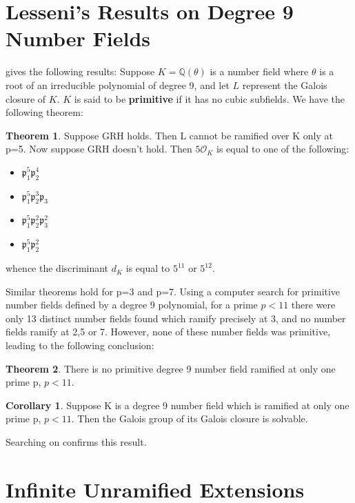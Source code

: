 \documentclass[12pt]{extarticle}
\newcommand{\<}{\langle}
\renewcommand{\>}{\rangle}
\theoremstyle{definition}
\newtheorem{theorem}{Theorem}
\newtheorem{corollary}{Corollary}
\begin{document}
\section{Lesseni's Results on Degree 9 Number Fields}
\cite{LESSENI} gives the following results:
Suppose $K=\mathbb{Q}(\theta)$ is a number field where $\theta$ is a root of an irreducible polynomial of degree 9, and let $L$ represent the Galois closure of $K$. $K$ is said to be \textbf{primitive} if it has no cubic subfields. We have the following theorem: \begin{theorem}
    Suppose GRH holds. Then L cannot be ramified over K only at p=5. Now suppose GRH doe{}sn't hold. Then $5\mathcal{O}_K$ is equal to one of the following: \begin{itemize}
        \item $\mathfrak{p}_1^5\mathfrak{p}_2^4$
        \item $\mathfrak{p}_1^5\mathfrak{p}_2^3\mathfrak{p}_3$
        \item $\mathfrak{p}_1^5\mathfrak{p}_2^2\mathfrak{p}_3^2$
        \item  $\mathfrak{p}_1^5\mathfrak{p}_2^2$
    \end{itemize}
    whence the discriminant $d_K$ is equal to $5^{11}$ or $5^{12}$. 
\end{theorem}
Similar theorems hold for p=3 and p=7.  Using a computer search for primitive number fields defined by a degree 9 polynomial, for a prime $p<11$ there were only 13 distinct number fields found which ramify precisely at 3, and no number fields ramify at 2,5 or 7. However, none of these number fields was primitive, leading to the following conclusion:
\begin{theorem}
    There is no primitive degree 9 number field ramified at only one prime p, $p<11$.
\end{theorem}
\begin{corollary}
 Suppose K is a degree 9 number field which is ramified at only one prime p, $p<11$. Then the Galois group of its Galois closure is solvable. 
\end{corollary}
Searching on \cite{JONE2} confirms this result. 


\section{Infinite Unramified Extensions}
\end{document}
